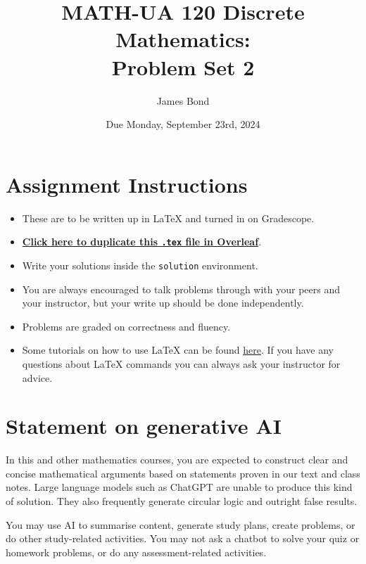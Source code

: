 \documentclass{article}
\title{\textbf{MATH-UA 120 Discrete Mathematics: \\ Problem Set 2}}
\author{%
    James Bond %
}
\date{Due Monday, September 23rd, 2024} %
\theoremstyle{definition}
\begin{document}
\maketitle %

\vfill

\section*{Assignment Instructions}

\begin{itemize}
    \item These are to be written up in \LaTeX{} and turned in on Gradescope.
    \item \href{https://bit.ly/3XfKMtA}{\textbf{Click here to duplicate this \texttt{.tex} file in Overleaf}}.
    \item Write your solutions inside the \texttt{solution} environment.
    \item You are always encouraged to talk problems through with your peers and your instructor, but your write up should be done independently.
    \item Problems are graded on correctness and fluency.
    \item Some tutorials on how to use \LaTeX{} can be found \href{https://www.overleaf.com/learn/latex/Tutorials}{\underline{here}}. If you have any questions about \LaTeX{} commands you can always ask your instructor for advice.
\end{itemize}

\vfill

\section*{Statement on generative AI}

In this and other mathematics courses, you are expected to construct clear and concise mathematical arguments based on statements proven in our text and class notes. Large language models such as ChatGPT are unable to produce this kind of solution. They also frequently generate circular logic and outright false results.
 
You may use AI to summarise content, generate study plans, create problems, or do other study-related activities. You may not ask a chatbot to solve your quiz or homework problems, or do any assessment-related activities.
 
\end{document}
